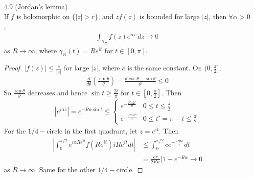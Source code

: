\documentclass[a4paper]{article}
\begin{document}
\begin{lemma} 4.9 (Jordan's lemma)\\
If $f$ is holomorphic on $\{|z|>r\}$, and $z f(z)$ is bounded for large $|z|$, then $\forall \alpha > 0$,
\begin{equation*}
\begin{aligned}
\int_{\gamma_R} f(z) e^{i\alpha z} dz \to 0
\end{aligned}
\end{equation*}
as $R\to \infty$, where $\gamma_R(t) = Re^{it}$ for $t \in [0,\pi]$.
\begin{proof}
$|f(z)| \leq \frac{c}{|z|}$ for large $|z|$, where $c$ is the same constant. On $(0,\frac{\pi}{2}]$,
\begin{equation*}
\begin{aligned}
\frac{d}{d\theta}\left(\frac{\sin\theta}{\theta}\right) = \frac{\theta \cos \theta - \sin\theta}{\theta} \leq 0
\end{aligned}
\end{equation*}
So $\frac{\sin\theta}{\theta}$ decreases and hence $\sin t \geq \frac{2t}{\pi}$ for $t \in [0,\frac{\pi}{2}]$. Then
\begin{equation*}
\begin{aligned}
|e^{i\alpha z}| = e^{-R\alpha \sin t} \leq \left\{\begin{array}{ll}
e^{-\frac{R\alpha 2t}{\pi}} & 0 \leq t \leq \frac{\pi}{2}\\
e^{-\frac{R\alpha 2t'}{\pi}} & 0 \leq t' = \pi-t \leq \frac{\pi}{2}
\end{array}\right.
\end{aligned}
\end{equation*}
For the $1/4-$circle in the first quadrant, let $z=e^{it}$. Then
\begin{equation*}
\begin{aligned}
\left|\int_0^{\pi/2} e^{i\alpha Re^{it}} f(Re^{it}) iRe^{it} dt\right| &\leq \int_0^{\pi/2} ce^{-\frac{2Rt\alpha}{\pi}} dt\\
&= \frac{c\pi}{2R\alpha} [1-e^{-R\alpha} \to 0
\end{aligned}
\end{equation*}
as $R \to \infty$. Same for the other $1/4-$circle.
\end{proof}
\end{lemma}
\end{document}
